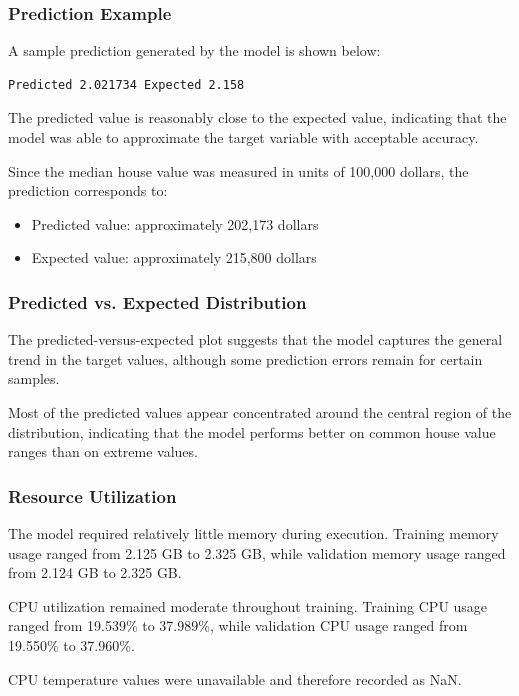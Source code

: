 \documentclass{ieeeaccess}
\begin{document}
\subsubsection{Prediction Example}

A sample prediction generated by the model is shown below:

\begin{lstlisting}
Predicted 2.021734 Expected 2.158
\end{lstlisting}

The predicted value is reasonably close to the expected value, indicating that the model was able to approximate the target variable with acceptable accuracy.

Since the median house value was measured in units of 100,000 dollars, the prediction corresponds to:

\begin{itemize}
    \item Predicted value: approximately 202,173 dollars
    \item Expected value: approximately 215,800 dollars
\end{itemize}

\subsubsection{Predicted vs. Expected Distribution}

The predicted-versus-expected plot suggests that the model captures the general trend in the target values, although some prediction errors remain for certain samples.

Most of the predicted values appear concentrated around the central region of the distribution, indicating that the model performs better on common house value ranges than on extreme values.

\subsubsection{Resource Utilization}

The model required relatively little memory during execution. Training memory usage ranged from 2.125 GB to 2.325 GB, while validation memory usage ranged from 2.124 GB to 2.325 GB.

CPU utilization remained moderate throughout training. Training CPU usage ranged from 19.539\% to 37.989\%, while validation CPU usage ranged from 19.550\% to 37.960\%.

CPU temperature values were unavailable and therefore recorded as NaN.
\end{document}
